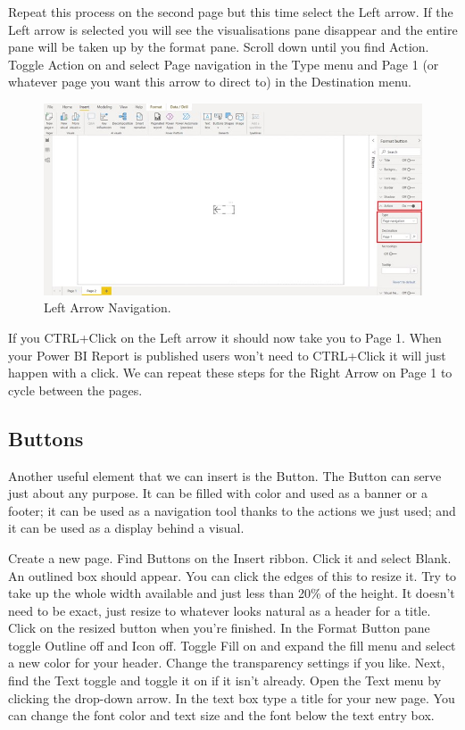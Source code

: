 \documentclass[
]{book}
\begin{document}
Repeat this process on the second page but this time select the Left arrow. If the Left arrow is selected you will see the visualisations pane disappear and the entire pane will be taken up by the format pane. Scroll down until you find Action. Toggle Action on and select Page navigation in the Type menu and Page 1 (or whatever page you want this arrow to direct to) in the Destination menu.

\begin{figure}
\centering
\includegraphics{bi12.jpg}
\caption{Left Arrow Navigation.}
\end{figure}

If you CTRL+Click on the Left arrow it should now take you to Page 1. When your Power BI Report is published users won't need to CTRL+Click it will just happen with a click. We can repeat these steps for the Right Arrow on Page 1 to cycle between the pages.

\hypertarget{buttons}{%
\subsection{Buttons}\label{buttons}}

Another useful element that we can insert is the Button. The Button can serve just about any purpose. It can be filled with color and used as a banner or a footer; it can be used as a navigation tool thanks to the actions we just used; and it can be used as a display behind a visual.

Create a new page. Find Buttons on the Insert ribbon. Click it and select Blank. An outlined box should appear. You can click the edges of this to resize it. Try to take up the whole width available and just less than 20\% of the height. It doesn't need to be exact, just resize to whatever looks natural as a header for a title. Click on the resized button when you're finished. In the Format Button pane toggle Outline off and Icon off. Toggle Fill on and expand the fill menu and select a new color for your header. Change the transparency settings if you like. Next, find the Text toggle and toggle it on if it isn't already. Open the Text menu by clicking the drop-down arrow. In the text box type a title for your new page. You can change the font color and text size and the font below the text entry box.
\end{document}
